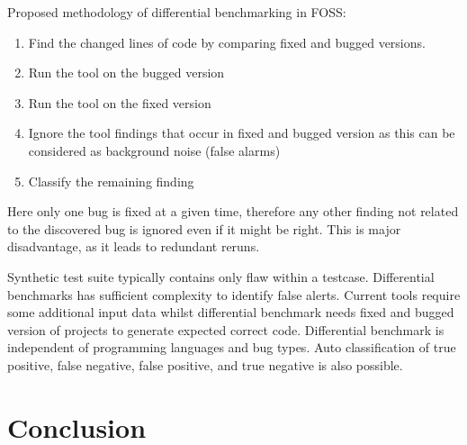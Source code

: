 \documentclass[authoryear,preprint]{sigplanconf}
\begin{document}
Proposed methodology of differential benchmarking in FOSS:
\begin{enumerate}
	\item Find the changed lines of code by comparing fixed and bugged versions.
	\item Run the tool on the bugged version
	\item Run the tool on the fixed version
	\item Ignore the tool findings that occur in fixed and bugged version as this can be considered as background noise (false alarms)
	\item Classify the remaining finding
\end{enumerate}

Here only one bug is fixed at a given time, therefore any other finding not related to the discovered bug is ignored even if it might be right. This is major disadvantage, as it leads to redundant reruns.

Synthetic test suite typically contains only flaw within a testcase. Differential benchmarks has sufficient complexity to identify false alerts. Current tools require some additional input data whilst differential benchmark needs fixed and bugged version of projects to generate expected correct code. Differential benchmark is independent of programming languages and bug types. Auto classification of true positive, false negative, false positive, and true negative is also possible. 

\section{Conclusion}

		
	
	
	
	
\end{document}
